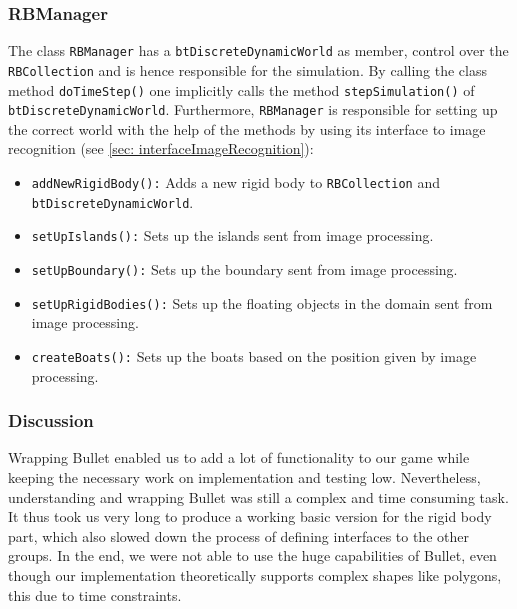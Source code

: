 \subsubsection*{RBManager}
\label{sec: rbManager}
The class \texttt{RBManager} has a \texttt{btDiscreteDynamicWorld} as member, control over the \texttt{RBCollection} and is hence responsible for the simulation. By calling the class method \texttt{doTimeStep()} one implicitly calls the method \texttt{stepSimulation()} of \texttt{btDiscreteDynamicWorld}. 
Furthermore, \texttt{RBManager} is responsible for setting up the correct world with the help of the methods by using its interface to image recognition (see \autoref{sec: interfaceImageRecognition}):
\begin{itemize}
\item \texttt{addNewRigidBody():} Adds a new rigid body to \texttt{RBCollection} and \texttt{btDiscreteDynamicWorld}.
\item \texttt{setUpIslands():} Sets up the islands sent from image processing.
\item \texttt{setUpBoundary():} Sets up the boundary sent from image processing.
\item \texttt{setUpRigidBodies():} Sets up the floating objects in the domain sent from image processing.
\item \texttt{createBoats():} Sets up the boats based on the position given by image processing.
\end{itemize}

\subsubsection{Discussion}
Wrapping Bullet enabled us to add a lot of functionality to our game while keeping the necessary work on implementation and testing low. Nevertheless, understanding and wrapping Bullet was still a complex and time consuming task. It thus took us very long to produce a working basic version for the rigid body part, which also slowed down the process of defining interfaces to the other groups. In the end, we were not able to use the huge capabilities of Bullet, even though our implementation theoretically supports complex shapes like polygons, this due to time constraints.

